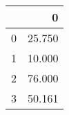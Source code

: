 \begin{tabular}{lr}
\toprule
{} &       0 \\
\midrule
0 &  25.750 \\
1 &  10.000 \\
2 &  76.000 \\
3 &  50.161 \\
\bottomrule
\end{tabular}
